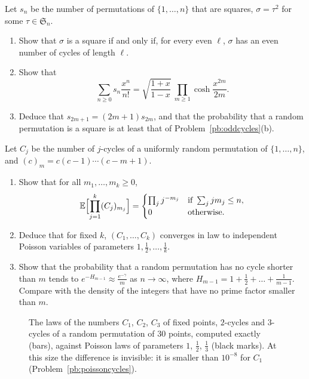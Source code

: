 \begin{exercise}[$\star\star\star$]\label{pb:squares}
Let $s_n$ be the number of permutations of $\{1,\dots,n\}$ that are squares, $\sigma=\tau^2$ for some $\tau\in\mathfrak S_n$.
\begin{enumerate}[label=(\alph*)]
\item Show that $\sigma$ is a square if and only if, for every even $\ell$, $\sigma$ has an even number of cycles of length $\ell$.
\item Show that
\[
\sum_{n\ge0}s_n\frac{x^n}{n!}=\sqrt{\frac{1+x}{1-x}}\ \prod_{m\ge1}\cosh\frac{x^{2m}}{2m}.
\]
\item Deduce that $s_{2m+1}=(2m+1)s_{2m}$, and that the probability that a random permutation is a square is at least that of
Problem~\ref{pb:oddcycles}(b).
\end{enumerate}
\end{exercise}

\begin{exercise}[$\star\star$]\label{pb:poissoncycles}
Let $C_j$ be the number of $j$-cycles of a uniformly random permutation of $\{1,\dots,n\}$, and $(c)_m=c(c-1)\cdots(c-m+1)$.
\begin{enumerate}[label=(\alph*)]
\item Show that for all $m_1,\dots,m_k\ge0$,
\[
\mathbb E\Bigl[\prod_{j=1}^k(C_j)_{m_j}\Bigr]=\begin{cases}\prod_jj^{-m_j}&\text{if }\sum_jjm_j\le n,\\0&\text{otherwise.}\end{cases}
\]
\item Deduce that for fixed $k$, $(C_1,\dots,C_k)$ converges in law to independent Poisson variables of parameters
$1,\frac12,\dots,\frac1k$.
\item Show that the probability that a random permutation has no cycle shorter than $m$ tends to
$e^{-H_{m-1}}\approx\frac{e^{-\gamma}}m$ as $n\to\infty$, where $H_{m-1}=1+\frac12+\dots+\frac1{m-1}$. Compare with the
density of the integers that have no prime factor smaller than $m$.
\end{enumerate}
\end{exercise}

\begin{figure}[ht]
\centering
{}
\caption{The laws of the numbers $C_1$, $C_2$, $C_3$ of fixed points, $2$-cycles and $3$-cycles of a random permutation of
$30$ points, computed exactly (bars), against Poisson laws of parameters $1$, $\frac12$, $\frac13$ (black marks). At this size
the difference is invisible: it is smaller than $10^{-8}$ for $C_1$ (Problem~\ref{pb:poissoncycles}).}
\label{fig:cycles}
\end{figure}

